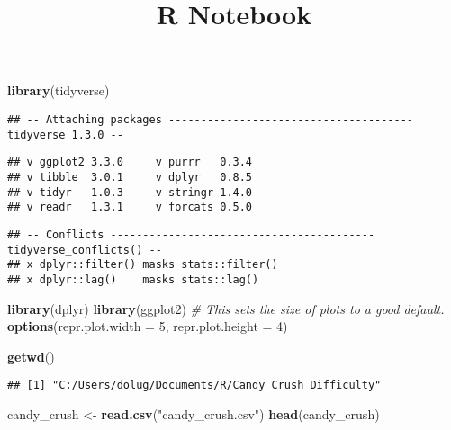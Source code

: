 \documentclass[
]{article}
\title{R Notebook}
\author{}
\date{\vspace{-2.5em}}
\newenvironment{Shaded}{\begin{snugshade}}{\end{snugshade}}
\newcommand{\CommentTok}[1]{\textcolor[rgb]{0.56,0.35,0.01}{\textit{#1}}}
\newcommand{\DataTypeTok}[1]{\textcolor[rgb]{0.13,0.29,0.53}{#1}}
\newcommand{\DecValTok}[1]{\textcolor[rgb]{0.00,0.00,0.81}{#1}}
\newcommand{\KeywordTok}[1]{\textcolor[rgb]{0.13,0.29,0.53}{\textbf{#1}}}
\newcommand{\NormalTok}[1]{#1}
\newcommand{\StringTok}[1]{\textcolor[rgb]{0.31,0.60,0.02}{#1}}
\begin{document}
\maketitle

\begin{Shaded}
\begin{Highlighting}[]
\KeywordTok{library}\NormalTok{(tidyverse)}
\end{Highlighting}
\end{Shaded}

\begin{verbatim}
## -- Attaching packages -------------------------------------- tidyverse 1.3.0 --
\end{verbatim}

\begin{verbatim}
## v ggplot2 3.3.0     v purrr   0.3.4
## v tibble  3.0.1     v dplyr   0.8.5
## v tidyr   1.0.3     v stringr 1.4.0
## v readr   1.3.1     v forcats 0.5.0
\end{verbatim}

\begin{verbatim}
## -- Conflicts ----------------------------------------- tidyverse_conflicts() --
## x dplyr::filter() masks stats::filter()
## x dplyr::lag()    masks stats::lag()
\end{verbatim}

\begin{Shaded}
\begin{Highlighting}[]
\KeywordTok{library}\NormalTok{(dplyr)}
\KeywordTok{library}\NormalTok{(ggplot2)}
\CommentTok{# This sets the size of plots to a good default.}
\KeywordTok{options}\NormalTok{(}\DataTypeTok{repr.plot.width =} \DecValTok{5}\NormalTok{, }\DataTypeTok{repr.plot.height =} \DecValTok{4}\NormalTok{)}

\KeywordTok{getwd}\NormalTok{()}
\end{Highlighting}
\end{Shaded}

\begin{verbatim}
## [1] "C:/Users/dolug/Documents/R/Candy Crush Difficulty"
\end{verbatim}

\begin{Shaded}
\begin{Highlighting}[]
\NormalTok{candy_crush <-}\StringTok{ }\KeywordTok{read.csv}\NormalTok{(}\StringTok{"candy_crush.csv"}\NormalTok{)}
\KeywordTok{head}\NormalTok{(candy_crush)}
\end{Highlighting}
\end{Shaded}
\end{document}

